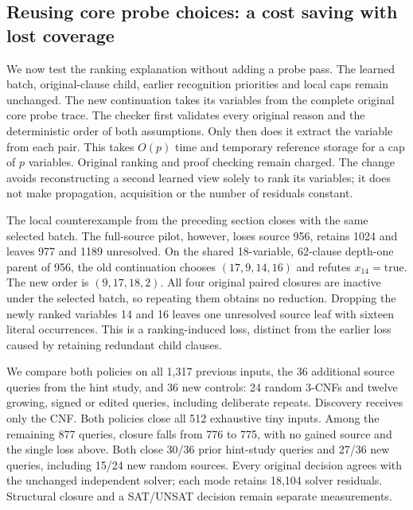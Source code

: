\documentclass[11pt,a4paper]{article}
\numberwithin{equation}{section}
\theoremstyle{plain}
\theoremstyle{definition}
\theoremstyle{remark}
\begin{document}
\subsection{Reusing core probe choices: a cost saving with lost coverage}
\label{sec:core-probe-order}

We now test the ranking explanation without adding a probe pass. The learned batch, original-clause child, earlier recognition priorities and local caps remain unchanged. The new continuation takes its variables from the complete original core probe trace. The checker first validates every original reason and the deterministic order of both assumptions. Only then does it extract the variable from each pair. This takes $O(p)$ time and temporary reference storage for a cap of $p$ variables. Original ranking and proof checking remain charged. The change avoids reconstructing a second learned view solely to rank its variables; it does not make propagation, acquisition or the number of residuals constant.

The local counterexample from the preceding section closes with the same selected batch. The full-source pilot, however, loses source 956, retains 1024 and leaves 977 and 1189 unresolved. On the shared 18-variable, 62-clause depth-one parent of 956, the old continuation chooses $(17,9,14,16)$ and refutes $x_{14}=\mathrm{true}$. The new order is $(9,17,18,2)$. All four original paired closures are inactive under the selected batch, so repeating them obtains no reduction. Dropping the newly ranked variables 14 and 16 leaves one unresolved source leaf with sixteen literal occurrences. This is a ranking-induced loss, distinct from the earlier loss caused by retaining redundant child clauses.

We compare both policies on all 1,317 previous inputs, the 36 additional source queries from the hint study, and 36 new controls: 24 random 3-CNFs and twelve growing, signed or edited queries, including deliberate repeats. Discovery receives only the CNF. Both policies close all 512 exhaustive tiny inputs. Among the remaining 877 queries, closure falls from 776 to 775, with no gained source and the single loss above. Both close 30/36 prior hint-study queries and 27/36 new queries, including 15/24 new random sources. Every original decision agrees with the unchanged independent solver; each mode retains 18,104 solver residuals. Structural closure and a SAT/UNSAT decision remain separate measurements.
\end{document}
